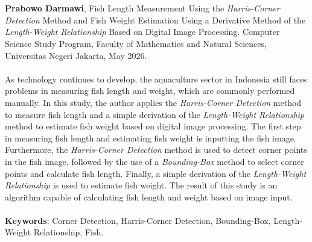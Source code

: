 \chapter*{}
\singlespacing{}

\textbf{Prabowo Darmawi}, Fish Length Measurement Using the \emph{Harris-Corner Detection} Method and Fish Weight Estimation Using a Derivative Method of the \emph{Length-Weight Relationship} Based on Digital Image Processing. 
Computer Science Study Program, Faculty of Mathematics and Natural Sciences, Universitas Negeri Jakarta, May 2026.
\\
\\
As technology continues to develop, the aquaculture sector in Indonesia still faces
problems in measuring fish length and weight, which are commonly performed
manually. In this study, the author applies the \emph{Harris-Corner Detection}
method to measure fish length and a simple derivation of the
\emph{Length-Weight Relationship} method to estimate fish weight based on digital
image processing. The first step in measuring fish length and estimating fish weight is inputting the
fish image. Furthermore, the \emph{Harris-Corner Detection} method is used to
detect corner points in the fish image, followed by the use of a
\emph{Bounding-Box} method to select corner points and calculate fish length.
Finally, a simple derivation of the \emph{Length-Weight Relationship} is used to
estimate fish weight. The result of this study is an algorithm capable of calculating fish length and
weight based on image input.
\\
\\
\textbf{Keywords}: Corner Detection, Harris-Corner Detection, Bounding-Box, Length-Weight Relationship, Fish.